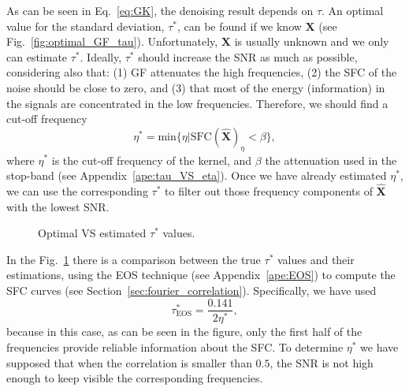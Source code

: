 \documentclass{article}
\begin{document}
As can be seen in Eq.~\ref{eq:GK}, the denoising result depends on
$\tau$. An optimal value for the standard deviation, $\tau^*$, can be
found if we know $\mathbf{X}$ (see
Fig.~\ref{fig:optimal_GF_tau}). Unfortunately, $\mathbf{X}$ is usually
unknown and we only can estimate $\tau^*$. Ideally, $\tau^*$ should
increase the SNR as much as possible, considering also that: (1) GF
attenuates the high frequencies, (2) the SFC of the noise should be
close to zero, and (3) that most of the energy (information) in the
signals are concentrated in the low frequencies. Therefore, we should
find a cut-off frequency
\begin{equation}
  \eta^* = \text{min}\{\eta|\text{SFC}(\hat{\mathbf{X}})_\eta < \beta\},
  \label{eq:search_eta}
\end{equation}
where $\eta^*$ is the cut-off frequency of the kernel, and $\beta$ the
attenuation used in the stop-band (see
Appendix~\ref{ape:tau_VS_eta}). Once we have already estimated
$\eta^*$, we can use the corresponding $\tau^*$ to filter out those
frequency components of $\hat{\mathbf{X}}$ with the lowest SNR.

\begin{figure}
  \centering
  \caption{Optimal VS estimated $\tau^*$ values.\label{fig:tau_GF_estimation}}
\end{figure}

In the Fig.~\ref{fig:tau_GF_estimation} there is a comparison between
the true $\tau^*$ values and their estimations, using the EOS
technique (see Appendix~\ref{ape:EOS}) to compute the SFC curves (see
Section~\ref{sec:fourier_correlation}). Specifically, we have used
\begin{equation}
  \tau^*_{\text{EOS}} = \frac{0.141}{2\eta^*},
  \label{eq:tau_VS_eta_empirical_EOS}
\end{equation}
because in this case, as can be seen in the figure, only the first
half of the frequencies provide reliable information about the SFC. To
determine $\eta^*$ we have supposed that when the correlation is
smaller than $0.5$, the SNR is not high enough to keep visible the
corresponding frequencies.
\end{document}
